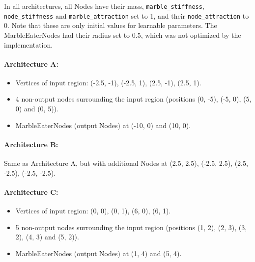 In all architectures, all Nodes have their mass, \texttt{marble\_stiffness},
\texttt{node\_stiffness} and \texttt{marble\_attraction} set to 1, 
and their \texttt{node\_attraction} to 0. 
Note that these are only initial values for learnable parameters. 
The MarbleEaterNodes had their radius set to 0.5, which was not optimized by the implementation.

\paragraph{Architecture A:}
\begin{itemize}
	\item Vertices of input region: (-2.5, -1), (-2.5, 1), (2.5, -1), (2.5, 1).
	\item 4 non-output nodes surrounding the input region (positions (0, -5), (-5, 0), (5, 0) and (0, 5)).
	\item MarbleEaterNodes (output Nodes) at (-10, 0) and (10, 0).
\end{itemize}

\paragraph{Architecture B:}
Same as Architecture A, but with additional Nodes at (2.5, 2.5), (-2.5, 2.5), (2.5, -2.5), (-2.5, -2.5).

\paragraph{Architecture C:}
\begin{itemize}
	\item Vertices of input region: (0, 0), (0, 1), (6, 0), (6, 1).
	\item 5 non-output nodes surrounding the input region (positions (1, 2), (2, 3), (3, 2), (4, 3) and (5, 2)).
	\item MarbleEaterNodes (output Nodes) at (1, 4) and (5, 4).
\end{itemize}

